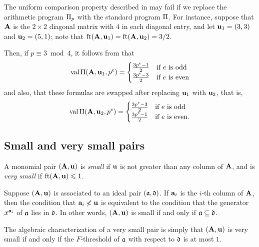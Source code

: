 \documentclass{amsart}
\begin{document}
\begin{example}
\label{max depends on p and e: E}  The uniform comparison property described in  may fail if we replace the arithmetic program $\Pi_p$ with the standard program $\Pi$.  For instance, suppose that $\mathbf{A}$ is the $2 \times 2$ diagonal matrix with $4$ in each diagonal entry, and let $\mathbf{u}_1=(3,3)$ and $\mathbf{u}_2=(5,1)$;  note that $\operatorname{ft}(\mathbf{A}, \mathbf{u}_1) = \operatorname{ft}(\mathbf{A}, \mathbf{u}_2) = 3/2$.

Then, if $p \equiv 3 \bmod 4$, it follows from   that
\[
\operatorname{val}\Pi(\mathbf{A}, \mathbf{u}_1, p^e) = \begin{cases}
\frac{3 p^e - 1}{2} & \text{if } e \text{ is odd} \\
\frac{3 p^e - 3}{2} & \text{if } e \text{ is even}
\end{cases}
\]
and also, that these formulas are swapped after replacing $\mathbf{u}_1$ with $\mathbf{u}_2$, that is, 
\[
\operatorname{val}\Pi(\mathbf{A}, \mathbf{u}_2, p^e) = \begin{cases}
\frac{3 p^e - 3}{2} & \text{if } e \text{ is odd} \\ 
\frac{3 p^e - 1}{2} & \text{if } e \text{ is even}.
\end{cases}
\]
\end{example}


\subsection{Small and very small pairs}

\begin{definition}
A monomial pair $(\mathbf{A}, \mathbf{u})$ is \emph{small} if $\mathbf{u}$ is not greater than any column of $\mathbf{A}$, and is \emph{very small} if $\operatorname{ft}(\mathbf{A}, \mathbf{u}) \leqslant 1$.
\end{definition}

\begin{remark}
\label{algebraic small and very small: R}
  Suppose $(\mathbf{A}, \mathbf{u})$ is associated to an ideal pair $(\mathfrak{a}, \mathfrak{d})$.  If $\mathbf{a}_i$ is the $i$-th column of $\mathbf{A}$, then the condition that $\mathbf{a}_i \not < \mathbf{u}$ is equivalent to the condition that the generator $x^{\mathbf{a}_i}$ of $\mathfrak{a}$ lies in $\mathfrak{d}$.  In other words, $(\mathbf{A}, \mathbf{u})$ is small if and only if $\mathfrak{a} \subseteq \mathfrak{d}$.

The algebraic characterization of a very small pair is simply that $(\mathbf{A}, \mathbf{u})$ is very small if and only if the $F$-threshold of $\mathfrak{a}$ with respect to $\mathfrak{d}$ is at most $1$.
\end{remark}
\end{document}
